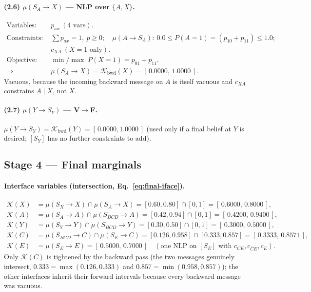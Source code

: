 \documentclass[11pt]{article}
\newcommand{\cK}{\mathcal{K}}
\newcommand{\bwd}{\mathrm{bwd}}
\begin{document}
\paragraph{(2.6) $\mu(S_A\!\to\!X)$ --- NLP over $\{A,X\}$.}
\begin{align*}
  \text{Variables: } & p_{ax}\ (4\text{ vars}).\\
  \text{Constraints: } & \textstyle\sum p_{ax}=1,\ p\ge0;\quad
                          \mu(A\!\to\!S_A){:}\ 0.0\le P(A{=}1)=(p_{10}{+}p_{11})\le 1.0;\\
                       & c_{XA}\ (X{=}1\text{ only}).\\
  \text{Objective: } & \min/\max\; P(X{=}1)=p_{01}{+}p_{11}.\\
  \Rightarrow\;& \mu(S_A\!\to\!X)=\cK_\bwd(X)=[\,0.0000,\,1.0000\,].
\end{align*}
Vacuous, because the incoming backward message on $A$ is itself vacuous and
$c_{XA}$ constrains $A\mid X$, not $X$.

\paragraph{(2.7) $\mu(Y\!\to\!S_Y)$ --- V$\to$F.}
$\mu(Y\!\to\!S_Y)=\cK_\bwd(Y)=[\,0.0000,1.0000\,]$ (used only if a final
belief at $Y$ is desired; $[S_Y]$ has no further constraints to add).

\subsection{Stage 4 --- Final marginals}

\label{sec:final}
\paragraph{Interface variables (intersection, Eq.~\eqref{eq:final-iface}).}
\begin{align*}
  \cK(X) &= \mu(S_X\!\to\!X)\cap\mu(S_A\!\to\!X)
          = [0.60,0.80]\cap[0,1] = [\,0.6000,\,0.8000\,],\\
  \cK(A) &= \mu(S_A\!\to\!A)\cap\mu(S_{BCD}\!\to\!A)
          = [0.42,0.94]\cap[0,1] = [\,0.4200,\,0.9400\,],\\
  \cK(Y) &= \mu(S_Y\!\to\!Y)\cap\mu(S_{BCD}\!\to\!Y)
          = [0.30,0.50]\cap[0,1] = [\,0.3000,\,0.5000\,],\\
  \cK(C) &= \mu(S_{BCD}\!\to\!C)\cap\mu(S_E\!\to\!C)
          = [0.126,0.958]\cap[0.333,0.857] = [\,0.3333,\,0.8571\,],\\
  \cK(E) &= \mu(S_E\!\to\!E)= [\,0.5000,\,0.7000\,]\quad(\text{one NLP on }[S_E]\text{ with }c_{CE},c_{\bar C E},c_E).
\end{align*}
Only $\cK(C)$ is tightened by the backward pass (the two messages genuinely
intersect, $0.333=\max(0.126,0.333)$ and $0.857=\min(0.958,0.857)$); the other
interfaces inherit their forward intervals because every backward message was
vacuous.
\end{document}
